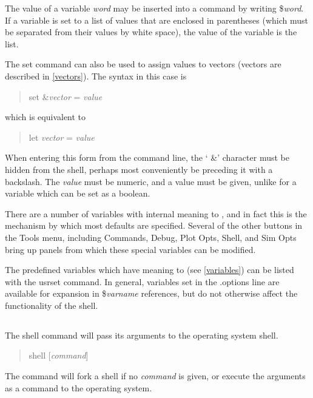 The value of a variable {\it word\/} may be inserted into a command by
writing {\vt \${\it word}}.  If a variable is set to a list of values
that are enclosed in parentheses (which must be separated from their
values by white space), the value of the variable is the list.

The set command can also be used to assign values to vectors (vectors
are described in \ref{vectors}).  The syntax in this case is
 
\begin{quote}
{\vt set \&}{\it vector} {\vt =} {\it value}
\end{quote}
 
which is equivalent to
 
\begin{quote}
{\vt let} {\it vector} {\vt =} {\it value}
\end{quote}
 
When entering this form from the {\WRspice} command line, the `{\vt
\&}' character must be hidden from the shell, perhaps most
conveniently be preceding it with a backslash.  The {\it value} must
be numeric, and a value must be given, unlike for a variable which can
be set as a boolean.

There are a number of variables with internal meaning to {\WRspice},
and in fact this is the mechanism by which most {\WRspice} defaults
are specified.  Several of the other buttons in the {\cb Tools} menu,
including {\cb Commands}, {\cb Debug}, {\cb Plot Opts}, {\cb Shell},
and {\cb Sim Opts} bring up panels from which these special variables
can be modified.

The predefined variables which have meaning to {\WRspice} (see
\ref{variables}) can be listed with the {\cb usrset} command.  In
general, variables set in the {\vt .options} line are available for
expansion in {\vt \$}{\it varname} references, but do not otherwise
affect the functionality of the shell.

\subsection{}


The {\cb shell} command will pass its arguments to the operating system
shell.
\begin{quote}\vt
shell [{\it command\/}]
\end{quote}
The command will fork a shell if no {\it command\/} is given, or
execute the arguments as a command to the operating system.

